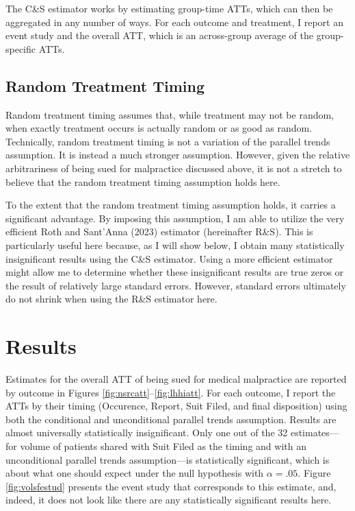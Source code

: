 \documentclass[
  12pt,
]{article}
\begin{document}
The C\&S estimator works by estimating group-time ATTs, which can then be aggregated in any number of ways. For each outcome and treatment, I report an event study and the overall ATT, which is an across-group average of the group-specific ATTs.

\hypertarget{random-treatment-timing}{%
\subsection{Random Treatment Timing}\label{random-treatment-timing}}

Random treatment timing assumes that, while treatment may not be random, when exactly treatment occurs is actually random or as good as random. Technically, random treatment timing is not a variation of the parallel trends assumption. It is instead a much stronger assumption. However, given the relative arbitrariness of being sued for malpractice discussed above, it is not a stretch to believe that the random treatment timing assumption holds here.

To the extent that the random treatment timing assumption holds, it carries a significant advantage. By imposing this assumption, I am able to utilize the very efficient Roth and Sant'Anna (2023) estimator (hereinafter R\&S). This is particularly useful here because, as I will show below, I obtain many statistically insignificant results using the C\&S estimator. Using a more efficient estimator might allow me to determine whether these insignificant results are true zeros or the result of relatively large standard errors. However, standard errors ultimately do not shrink when using the R\&S estimator here.

\hypertarget{results}{%
\section{Results}\label{results}}

Estimates for the overall ATT of being sued for medical malpractice are reported by outcome in Figures \ref{fig:nsrcatt}--\ref{fig:lhhiatt}. For each outcome, I report the ATTs by their timing (Occurence, Report, Suit Filed, and final disposition) using both the conditional and unconditional parallel trends assumption. Results are almost universally statistically insignificant. Only one out of the 32 estimates---for volume of patients shared with Suit Filed as the timing and with an unconditional parallel trends assumption---is statistically significant, which is about what one should expect under the null hypothesis with \(\alpha=.05\). Figure \ref{fig:volsfestud} presents the event study that corresponds to this estimate, and, indeed, it does not look like there are any statistically significant results here.
\end{document}
